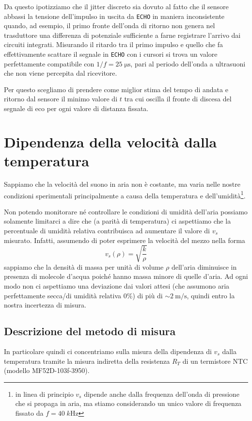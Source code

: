 \documentclass[10pt, a4paper, italian]{article}
\begin{document}
Da questo ipotizziamo che il jitter discreto sia dovuto al fatto che il
sensore abbassi la tensione dell'impulso in uscita da \verb+ECHO+ in maniera
inconsistente quando, ad esempio, il primo fronte dell'onda di ritorno non
genera nel trasduttore una differenza di potenziale sufficiente a farne
registrare l'arrivo dai circuiti integrati.
Misurando il ritardo tra il primo impulso e quello che fa effettivamente
scattare il segnale in \verb+ECHO+ con i cursori si trova un valore
perfettamente compatibile con $1/f = 25 \; \si{\micro\s}$, pari al
periodo dell'onda a ultrasuoni che non viene percepita dal ricevitore.

Per questo scegliamo di prendere come miglior stima del tempo di andata e
ritorno dal sensore il minimo valore di $t$ tra cui oscilla il fronte di
discesa del segnale di eco per ogni valore di distanza fissata.

\section{Dipendenza della velocità dalla temperatura}
Sappiamo che la velocità del suono in aria non è costante, ma varia nelle
nostre condizioni sperimentali principalmente a causa della temperatura e
dell'umidità\footnote{in linea di principio $v_s$ dipende anche dalla
frequenza dell'onda di pressione che si propaga in aria, ma stiamo
considerando un unico valore di frequenza fissato da $f = 40 \; \si{k\Hz}$}.

Non potendo monitorare né controllare le condizioni di umidità dell'aria
possiamo solamente limitarci a dire che (a parità di temperatura) ci
aspettiamo che la percentuale di umidità relativa contribuisca ad aumentare
il valore di $v_s$ misurato. Infatti, assumendo di poter esprimere la velocità
del mezzo nella forma
\begin{equation}
v_s(\rho) = \sqrt{\frac{k}{\rho}}
\end{equation}
sappiamo che la densità di massa per unità di volume $\rho$ dell'aria
diminuisce in presenza di molecole d'acqua poiché hanno massa minore di quelle
d'aria. Ad ogni modo non ci aspettiamo una deviazione dai valori attesi
(che assumono aria perfettamente secca/di umidità relativa $0 \percent$) di più
di $\sim \SI{2}{\m/\s}$, quindi entro la nostra incertezza di misura.

\subsection{Descrizione del metodo di misura}
In particolare quindi ci concentriamo sulla misura della dipendenza di $v_s$
dalla temperatura tramite la misura indiretta della resistenza $R_T$ di un
termistore NTC (modello MF52D-103f-3950).
\end{document}
